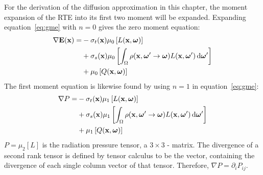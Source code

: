 For the derivation of the diffusion approximation in this chapter, the moment expansion of the RTE into its first two moment will be expanded. Expanding equation~\ref{eq:gme} with $n=0$ gives the zero moment equation:
\begin{align}
\nonumber
\nabla\boldsymbol{\mathbf{E}}(\boldsymbol{\mathbf{x}})=&
-\sigma_t(\boldsymbol{\mathbf{x}})\mu_0\left[L(\boldsymbol{\mathbf{x}}, \boldsymbol{\mathbf{\omega}})\right]
\\
\label{eq:p1_zero}
&+ \sigma_s(\boldsymbol{\mathbf{x}})\mu_0\left[\int_{\Omega}\rho(\boldsymbol{\mathbf{x}}, \boldsymbol{\mathbf{\omega}}'\rightarrow\boldsymbol{\mathbf{\omega}})L(\boldsymbol{\mathbf{x}}, \boldsymbol{\mathbf{\omega}}')\,\mathrm{d}\boldsymbol{\mathbf{\omega}}'\right] 
\\
\nonumber
&+ \mu_0\left[Q(\boldsymbol{\mathbf{x}}, \boldsymbol{\mathbf{\omega}})\right]
\end{align}
The first moment equation is likewise found by using $n=1$ in equation~\ref{eq:gme}:
\begin{align}
\nonumber
\nabla P =&
-\sigma_t(\boldsymbol{\mathbf{x}})\mu_1\left[L(\boldsymbol{\mathbf{x}}, \boldsymbol{\mathbf{\omega}})\right]
\\ &
\label{eq:p1_firstme}
+\sigma_s(\boldsymbol{\mathbf{x}})\mu_1\left[\int_{\Omega}\rho(\boldsymbol{\mathbf{x}}, \boldsymbol{\mathbf{\omega}}'\rightarrow\boldsymbol{\mathbf{\omega}})L(\boldsymbol{\mathbf{x}}, \boldsymbol{\mathbf{\omega}}')\,\mathrm{d}\boldsymbol{\mathbf{\omega}}'\right]
\\ &
\nonumber
+ \mu_1\left[Q(\boldsymbol{\mathbf{x}}, \boldsymbol{\mathbf{\omega}})\right]
\end{align}
$P=\mu_2[L]$ is the radiation pressure tensor, a $3\times3$ - matrix. The divergence of a second rank tensor is defined by tensor calculus to be the vector, containing the divergence of each single column vector of that tensor. Therefore, $\nabla P = \partial_i P_{ij}$.

